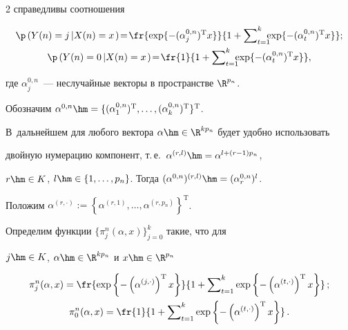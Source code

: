 \begin{multicols}{2}
справедливы соотношения


\begin{gather*}


\p\left(Y(n)=j\left|X(n)=x\right.\right)\!=\!\fr{\exp\{-(\alpha^{0,n}_j)^{\mathrm{T}}x\}}


{1+\sum\nolimits_{t=1}^k\!\!\!\hspace*{-0.5pt}\exp\{-(\alpha^{0,n}_t)^{\mathrm{T}}x\}};\\


\p\left(Y(n)=0\left|X(n)=x\right.\right)\!=\!\fr{1}{1+\sum\nolimits_{t=1}^k


\hspace*{-0.5pt}\!\!\!\exp\{-(\alpha^{0,n}_t)^{\mathrm{T}}x\}},


\end{gather*}


где $\alpha^{0,n}_j$~--- неслучайные векторы в пространстве $\R^{p_n}$. 


Обозначим $\alpha^{0,n}\hm=\{(\alpha^{0,n}_1)^{\mathrm{T}},\ldots,(\alpha^{0,n}_k)^{\mathrm{T}}\}^{\mathrm{T}}$. 


В~дальнейшем для любого вектора $\alpha\hm\in\R^{kp_n}$ будет удобно использовать 


двойную нумерацию компонент, т.\,е.\ $\alpha^{(r,l)}\hm=\alpha^{l+(r-1)p_n}$, 


$r\hm\in K$, $l\hm\in\{1,\ldots,p_n\}$. Тогда $(\alpha^{0,n})^{(r,l)}\hm=(\alpha^{0,n}_r)^l$. 


Положим $\alpha^{(r,\cdot)}:=\left\{\alpha^{(r,1)},\ldots,\alpha^{(r,p_n)}\right\}^{\mathrm{T}}$. 


Определим функции $\{\pi^n_j(\alpha,x)\}_{j=0}^k$ такие, что для 


$j\hm\in K$, $\alpha\hm\in\R^{kp_n}$ и $x\hm\in\R^{p_n}$


\begin{gather*}


\pi^n_j(\alpha,x)=\fr{\exp\left\{-\left(\alpha^{(j,\cdot)}\right)^{\mathrm{T}}x\right\}}


{1+\sum\nolimits_{t=1}^k\exp\left\{-\left(\alpha^{(t,\cdot)}\right)^{\mathrm{T}}x\right\}}\,;\\


\pi^n_0(\alpha,x)=\fr{1}{1+\sum\nolimits_{t=1}^k\exp\left\{-\left(\alpha^{(t,\cdot)}\right)^{\mathrm{T}}x\right\}}\,.


\end{gather*}






\end{multicols}
